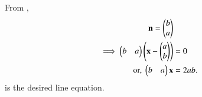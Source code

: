 From ,
\begin{align}
	\mathbf{n} = \begin{pmatrix}b \\ a\end{pmatrix}
\\	
\implies	\begin{pmatrix}b & a\end{pmatrix} \left(\mathbf{x}-\begin{pmatrix}a\\b\end{pmatrix}\right) &= 0\\
	\text{or, }	\begin{pmatrix}b & a\end{pmatrix}\mathbf{x} &= 2ab.
\end{align}
is the desired line equation.


